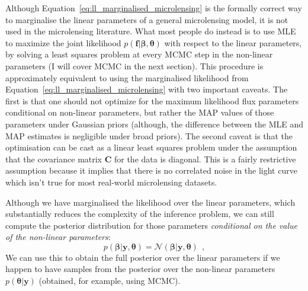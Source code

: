 \documentclass[12pt,dvipsnames]{report}
\renewcommand{\vec}[1]{\boldsymbol{\mathbf{#1}}}
\newcommand{\hquad}{~~}
\begin{document}
Although Equation~\ref{eq:ll_marginalised_microlensing} is the formally correct
way to marginalise the linear parameters of a general microlensing model, it is
not used in the microlensing literature. What most people do instead is to use 
MLE to maximize the joint likelihood $p(\vec{f}\lvert\vec\beta,\vec{\theta})$
with respect to the linear parameters, by solving a least squares problem at
every MCMC step in the non-linear parameters (I will cover MCMC in the next
section). This procedure is approximately equivalent to using the marginalised
likelihood from Equation~\ref{eq:ll_marginalised_microlensing} with two
important caveats. The first is that one should not optimize for the maximum
likelihood flux parameters conditional on non-linear parameters, but rather the
MAP values of those parameters under Gaussian priors (although, the difference
between the MLE and MAP estimates is negligible under broad priors). The second
caveat is that the optimisation can be cast as a linear least squares problem
under the assumption that the covariance matrix $\vec{C}$ for the data is
diagonal. This is a fairly restrictive assumption because it implies that
there is no correlated noise in the light curve which isn't true for most real-world
microlensing datasets.

Although we have marginalised the likelihood over the linear parameters, which
substantially reduces the complexity of the inference problem, we can still
compute the posterior distribution for those parameters \emph{conditional on
    the value of the non-linear parameters}:
\begin{equation}
    p(\vec\beta\lvert \vec{y}, \vec{\theta})=\mathcal{N}(\vec\beta\lvert \vec{y}, \vec{\theta})
    \hquad,
\end{equation}
We can use this to obtain the full posterior over the linear parameters if we happen
to have samples from the posterior over the non-linear parameters $p(\vec{\theta}|\vec{y})$
(obtained, for example, using MCMC).
\end{document}
